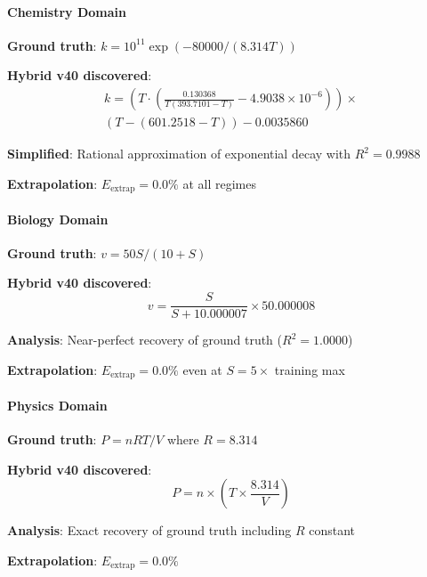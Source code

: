 \paragraph{Chemistry Domain}

\begin{example}
\textbf{Ground truth}: $k = 10^{11} \exp(-80000/(8.314T))$

\textbf{Hybrid v40 discovered}:
\begin{multline}
k = \left(T \cdot \left(\frac{0.130368}{T(393.7101 - T)} - 4.9038 \times 10^{-6}\right)\right) \times \\
\left(T - (601.2518 - T)\right) - 0.0035860
\end{multline}

\textbf{Simplified}:  Rational approximation of exponential decay with $R^2 = 0.9988$

\textbf{Extrapolation}: $E_{\text{extrap}} = 0.0\%$ at all regimes
\end{example}

\paragraph{Biology Domain}

\begin{example}
\textbf{Ground truth}: $v = 50S/(10 + S)$

\textbf{Hybrid v40 discovered}:
\begin{equation}
v = \frac{S}{S + 10.000007} \times 50.000008
\end{equation}

\textbf{Analysis}: Near-perfect recovery of ground truth ($R^2 = 1.0000$)

\textbf{Extrapolation}: $E_{\text{extrap}} = 0.0\%$ even at $S = 5\times$ training max
\end{example}

\paragraph{Physics Domain}

\begin{example}
\textbf{Ground truth}: $P = nRT/V$ where $R = 8.314$

\textbf{Hybrid v40 discovered}:
\begin{equation}
P = n \times \left(T \times \frac{8.314}{V}\right)
\end{equation}

\textbf{Analysis}: Exact recovery of ground truth including $R$ constant

\textbf{Extrapolation}: $E_{\text{extrap}} = 0.0\%$
\end{example}

